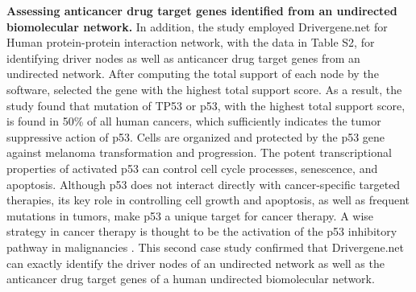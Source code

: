 \documentclass[5p,,preprint,12pt]{elsarticle}
\begin{document}
\textbf{Assessing anticancer drug target genes identified from an undirected biomolecular network.} In addition, the study employed Drivergene.net for Human protein-protein interaction network, with the data in Table S2, for identifying driver nodes as well as anticancer drug target genes from an undirected network. After computing the total support of each node by the software, selected the gene with the highest total support score. As a result, the study found that mutation of TP53 or p53, with the highest total support score, is found in 50\% of all human cancers, which sufficiently indicates the tumor suppressive action of p53. Cells are organized and protected by the p53 gene against melanoma transformation and progression. The potent transcriptional properties of activated p53 can control cell cycle processes, senescence, and apoptosis. Although p53 does not interact directly with cancer-specific targeted therapies, its key role in controlling cell growth and apoptosis, as well as frequent mutations in tumors, make p53 a unique target for cancer therapy. A wise strategy in cancer therapy is thought to be the activation of the p53 inhibitory pathway in malignancies \cite{50,51,52}. This second case study confirmed that Drivergene.net can exactly identify the driver nodes of an undirected network as well as the anticancer drug target genes of a human undirected biomolecular network.\\
\end{document}
